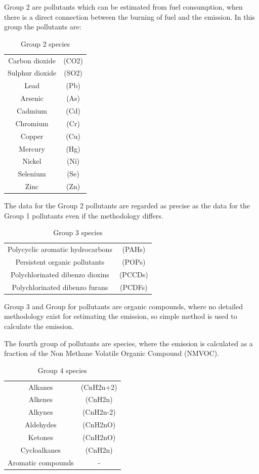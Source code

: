 Group 2 are pollutants which can be estimated from fuel consumption, when there is a direct connection between the burning of fuel and the emission. In this group the pollutants are: 	
\begin{table}[htbp]
  \centering
\begin{tabular}{@{} | c|c |@{}}
\hline
Carbon dioxide & (CO2) \\
Sulphur dioxide & (SO2) \\
Lead & (Pb)\\
Arsenic & (As)\\ 
Cadmium & (Cd)\\ 
Chromium & (Cr) \\
Copper & (Cu)\\
Mercury & (Hg) \\
Nickel & (Ni) \\
Selenium & (Se)\\ 
Zinc & (Zn)\\
\hline
\end{tabular}
  \caption{Group 2 species}
  \label{tab:group2}
\end{table}
The data for the Group 2 pollutants are regarded as precise as the data for the Group 1 pollutants even if the methodology differs.
\begin{table}[htbp]
  \centering
\begin{tabular}{@{} | c|c |@{}}
\hline
Polycyclic aromatic hydrocarbons & (PAHs) \\
Persistent organic pollutants & (POPs)\\
Polychlorinated dibenzo dioxins & (PCCDs)\\
Polychlorinated dibenzo furans &  (PCDFs)\\
\hline
\end{tabular}
  \caption{Group 3 species}
  \label{tab:group3}
\end{table}
Group 3 and Group for pollutants are organic compounds, where no detailed methodology exist for estimating the emission, so simple method is used to calculate the emission.

The fourth group of pollutants are species, where the emission is calculated as a fraction of the Non Methane Volatile Organic Compound (NMVOC).
\begin{table}[htbp]
  \centering
\begin{tabular}{@{} | c|c |@{}}
\hline
Alkanes & (CnH2n+2)\\
Alkenes &(CnH2n)\\
Alkynes & (CnH2n-2)\\
Aldehydes & (CnH2nO)\\
Ketones & (CnH2nO)\\
Cycloalkanes & (CnH2n)\\
Aromatic compounds& -\\
\hline
\end{tabular}
  \caption{Group 4 species}
  \label{tab:group4}
\end{table}
  
